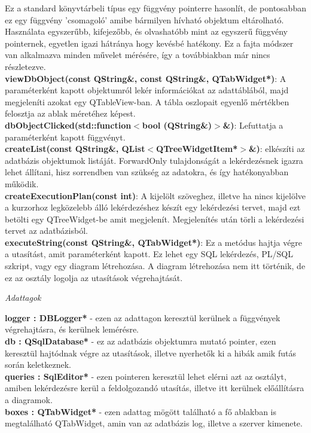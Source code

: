 Ez a standard könyvtárbeli típus egy függvény pointerre hasonlít, de pontosabban ez egy
függvény 'csomagoló' amibe bármilyen hívható objektum eltárolható. Használata egyszerűbb, kifejezőbb, és olvashatóbb mint az egyszerű függvény pointernek, egyetlen igazi hátránya
hogy kevésbé hatékony. Ez a fajta módszer van alkalmazva minden művelet mérésére, így a továbbiakban már nincs részletezve. \\
\textbf{viewDbObject(const QString\&, const QString\&, QTabWidget*)}: A paraméterként
kapott objektumról lekér információkat az adattáblából, majd megjeleníti azokat egy
QTableView-ban. A tábla oszlopait egyenlő mértékben felosztja az ablak méretéhez képest. \\
\textbf{dbObjectClicked(std::function$<$bool (QString\&)$>$\&)}: Lefuttatja a paraméterként
kapott függvényt. \\
\textbf{createList(const QString\&, QList$<$QTreeWidgetItem*$>$\&)}: elkészíti az adatbázis objektumok listáját. ForwardOnly tulajdonságát a lekérdezésnek igazra lehet állítani, hisz
sorrendben van szükség az adatokra, és így hatékonyabban működik. \\
\textbf{createExecutionPlan(const int)}: A kijelölt szöveghez, illetve ha nincs kijelölve a kurzorhoz legközelebb álló lekérdezéshez készít egy lekérdezési tervet, majd ezt betölti egy
QTreeWidget-be amit megjelenít. Megjelenítés után törli a lekérdezési tervet az adatbázisból. \\
\textbf{executeString(const QString\&, QTabWidget*)}: Ez a metódus hajtja végre a utasítást, amit paraméterként kapott. Ez lehet egy SQL lekérdezés, PL/SQL szkript, vagy egy diagram létrehozása. A diagram létrehozása nem itt történik, de ez az osztály logolja az utasítások végrehajtását.
\begin{flushleft}
\textit{Adattagok}
\end{flushleft}
\textbf{logger : DBLogger*} - ezen az adattagon keresztül kerülnek a függvények végrehajtásra, és kerülnek lemérésre. \\
\textbf{db : QSqlDatabase*} - ez az adatbázis objektumra mutató pointer, ezen keresztül hajtódnak végre az utasítások, illetve nyerhetők ki a hibák amik futás során keletkeznek. \\
\textbf{queries : SqlEditor*} - ezen pointeren keresztül lehet elérni azt az osztályt, amiben lekérdezésre kerül a feldolgozandó utasítás, illetve itt kerülnek előállításra a diagramok. \\
\textbf{boxes : QTabWidget*} - ezen adattag mögött található a fő ablakban is megtalálható
QTabWidget, amin van az adatbázis log, illetve a szerver kimenete.
\newpage
